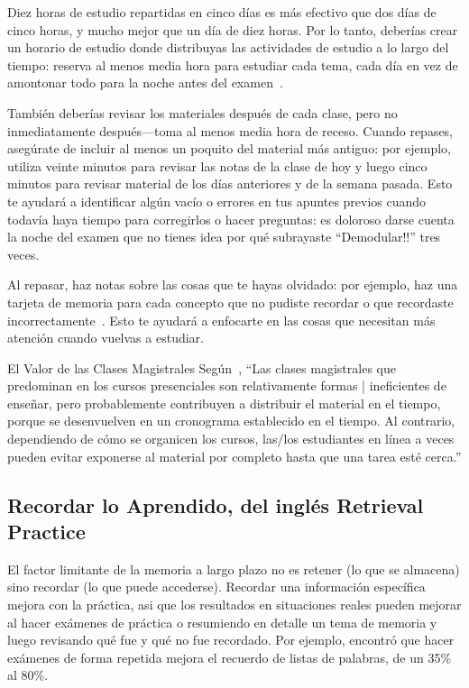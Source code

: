 Diez horas de estudio repartidas en cinco días
es más efectivo que dos días de cinco horas,
y mucho mejor que un día de diez horas.
Por lo tanto, deberías crear un horario de estudio donde distribuyas las actividades de estudio a lo largo del tiempo:
reserva al menos media hora para estudiar cada tema, cada día
en vez de amontonar todo para la noche antes del examen~\cite{Kang2016}.

También deberías revisar los materiales después de cada clase,
pero no inmediatamente después---toma al menos media hora de receso.
Cuando repases,
asegúrate de incluir al menos un poquito del material más antiguo:
por ejemplo,
utiliza veinte minutos para revisar las notas de la clase de hoy
y luego cinco minutos para revisar material de los días anteriores
y de la semana pasada.
Esto te ayudará a identificar algún vacío o errores en tus apuntes previos
cuando todavía haya tiempo para corregirlos o hacer preguntas:
es doloroso darse cuenta la noche del examen
que no tienes idea por qué subrayaste ``Demodular!!'' tres veces.

Al repasar,
haz notas sobre las cosas que te hayas olvidado:
por ejemplo,
haz una tarjeta de memoria para cada concepto que no pudiste recordar
o que recordaste incorrectamente~\cite{Matt2019}.
Esto te ayudará a enfocarte en las cosas que necesitan más atención cuando vuelvas a estudiar.

\begin{aside}{El Valor de las Clases Magistrales}
  Según~\cite{Mill2016a},
  ``Las clases magistrales que predominan en los cursos presenciales son relativamente formas     |   ineficientes de enseñar,
  pero probablemente contribuyen a distribuir el material en el tiempo,
  porque se desenvuelven en un cronograma establecido en el tiempo.
  Al contrario,
  dependiendo de cómo se organicen los cursos,
  las/los estudiantes en línea a veces pueden evitar exponerse al material por completo hasta que una     tarea esté cerca.''
\end{aside}

\subsection*{Recordar lo Aprendido, del inglés Retrieval Practice}

El factor limitante de la memoria a largo plazo no es retener (lo que se almacena)
sino recordar (lo que puede accederse).
Recordar una información específica mejora con la práctica,
asi que los resultados en situaciones reales pueden mejorar
al hacer exámenes de práctica o resumiendo en detalle un tema de memoria
y luego revisando qué fue y qué no fue recordado.
Por ejemplo,
\cite{Karp2008} encontró que hacer exámenes de forma repetida mejora el recuerdo de listas de palabras, de un 35\% al 80\%.

